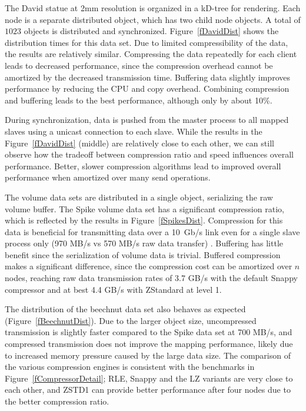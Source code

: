 \documentclass[10pt,journal,compsoc]{IEEEtran}
\newcommand{\FIXME}[1]{\textbf{\color{BLUE}{FIXME: #1}}}
\newcommand{\fig}[1]{Figure~\ref{#1}}
\begin{document}
The David statue at 2mm resolution is organized in a kD-tree for rendering. Each
node is a separate distributed object, which has two child node objects. A
total of $1023$ objects is distributed and synchronized. \fig{fDavidDist} shows
the distribution times for this data set. Due to limited compressibility of the
data, the results are relatively similar. Compressing the data repeatedly for
each client leads to decreased performance, since the compression overhead
cannot be amortized by the decreased transmission time. Buffering data slightly
improves performance by reducing the CPU and copy overhead. Combining
compression and buffering leads to the best performance, although only by about
10\%.

During synchronization, data is pushed from the master process to all mapped
slaves using a unicast connection to each slave. While the results in the
\fig{fDavidDist} (middle) are relatively close to each other, we can still
observe how the tradeoff between compression ratio and speed influences overall
performance. Better, slower compression algorithms lead to improved overall
performance when amortized over many send operations.

The volume data sets are distributed in a single object, serializing the
raw volume buffer. The Spike volume data set has a significant compression
ratio, which is reflected by the results in \fig{fSpikesDist}. Compression for this
data is beneficial for transmitting data over a 10~Gb/s link even for a single
slave process only (970 MB/s vs 570 MB/s raw data transfer) \FIXME{unclear}. Buffering has
little benefit since the serialization of volume data is trivial. Buffered
compression makes a significant difference, since the compression cost can be amortized
over $n$ nodes, reaching raw data transmission rates of 3.7 GB/s with the
default Snappy compressor and at best 4.4 GB/s with ZStandard at level 1.

The distribution of the beechnut data set also behaves as expected
(\fig{fBeechnutDist}). Due to the larger object size, uncompressed transmission
is slightly faster compared to the Spike data set at 700 MB/s, and compressed
transmission does not improve the mapping performance, likely due to increased
memory pressure caused by the large data size. The comparison of the various
compression engines is consistent with the benchmarks in
\fig{fCompressorDetail}; RLE, Snappy and the LZ variants are very close to each
other, and ZSTD1 can provide better performance after four nodes due to the
better compression ratio.
\end{document}
